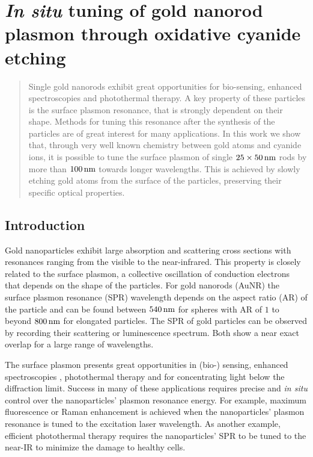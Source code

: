 \chapter[Cyanide Etching]{\textit{In situ} tuning of gold nanorod plasmon
through oxidative cyanide etching}
\label{ch:KCN}


\begin{abstract}
Single gold nanorods exhibit great opportunities for
bio-sensing, enhanced spectroscopies and photothermal therapy. A key property of these
particles is the surface plasmon resonance, that is strongly dependent on their
shape. Methods for tuning this resonance after the synthesis of the particles
are of great interest for many applications. In this work we show that, through
very well known chemistry between gold atoms and cyanide ions, it is possible
to tune the surface plasmon of single $25\times50\,\textrm{nm}$ rods by more than $100\,\textrm{nm}$
towards longer wavelengths. This is achieved by slowly etching gold atoms from
the surface of the particles, preserving their specific optical properties.
\end{abstract}	

\newpage

\section{Introduction}

Gold nanoparticles exhibit large absorption and scattering cross sections with
resonances ranging from the visible to the near-infrared. This property is
closely related to the surface plasmon, a collective oscillation of conduction
electrons that depends on the shape of the particles. For gold nanorods (AuNR)
the surface plasmon resonance (SPR) wavelength depends on the aspect ratio (AR)
of the particle and can be found between $540\,\textrm{nm}$ for spheres with AR of $1$ to
beyond $800\,\textrm{nm}$ for elongated particles. The SPR of gold particles
can be observed by recording their scattering or luminescence
spectrum\cite{Sonnichsen2002}. Both show a near exact overlap for a large range
of wavelengths\cite{Yorulmaz2012}.

The surface plasmon presents great opportunities in (bio-)
sensing\cite{Zijlstra2012}, enhanced spectroscopies \cite{Sivapalan2013},
photothermal therapy\cite{Zhao2014} and for concentrating light below the
diffraction limit\cite{Zijlstra2011}. Success in many of these applications
requires precise and \textit{in situ} control over the nanoparticles' plasmon
resonance energy. For example, maximum fluorescence\cite{Khatua2014} or Raman
enhancement\cite{McFarland2005} is achieved when the nanoparticles' plasmon
resonance is tuned to the excitation laser wavelength. As another example,
efficient photothermal therapy requires the nanoparticles' SPR to be tuned to
the near-IR to minimize the damage to healthy cells\cite{Alkilany2012}.

